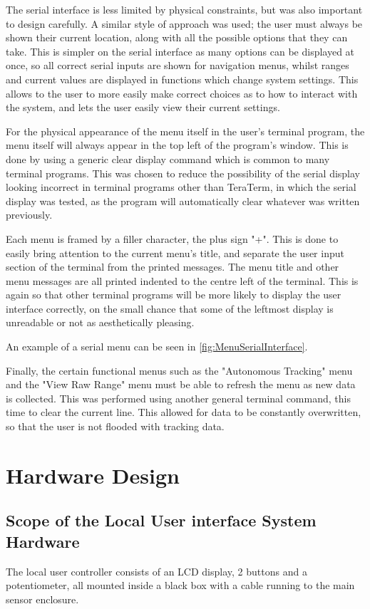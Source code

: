 \documentclass[]{report}
\begin{document}
The serial interface is less limited by physical constraints, but was also important to design carefully. A similar style of approach was used; the user must always be shown their current location, along with all the possible options that they can take. This is simpler on the serial interface as many options can be displayed at once, so all correct serial inputs are shown for navigation menus, whilst ranges and current values are displayed in functions which change system settings. This allows to the user to more easily make correct choices as to how to interact with the system, and lets the user easily view their current settings.

For the physical appearance of the menu itself in the user's terminal program, the menu itself will always appear in the top left of the program's window. This is done by using a generic clear display command which is common to many terminal programs. This was chosen to reduce the possibility of the serial display looking incorrect in terminal programs other than TeraTerm, in which the serial display was tested, as the program will automatically clear whatever was written previously.

Each menu is framed by a filler character, the plus sign "+". This is done to easily bring attention to the current menu's title, and separate the user input section of the terminal from the printed messages. The menu title and other menu messages are all printed indented to the centre left of the terminal. This is again so that other terminal programs will be more likely to display the user interface correctly, on the small chance that some of the leftmost display is unreadable or not as aesthetically pleasing.

An example of a serial menu can be seen in \ref{fig:MenuSerialInterface}.

Finally, the certain functional menus such as the "Autonomous Tracking" menu and the "View Raw Range" menu must be able to refresh the menu as new data is collected. This was performed using another general terminal command, this time to clear the current line. This allowed for data to be constantly overwritten, so that the user is not flooded with tracking data.

\chapter{Hardware Design}

\section{Scope of the Local User interface System Hardware}
The local user controller consists of an LCD display, 2 buttons and a potentiometer, all mounted inside a black box with a cable running to the main sensor enclosure.
\end{document}

